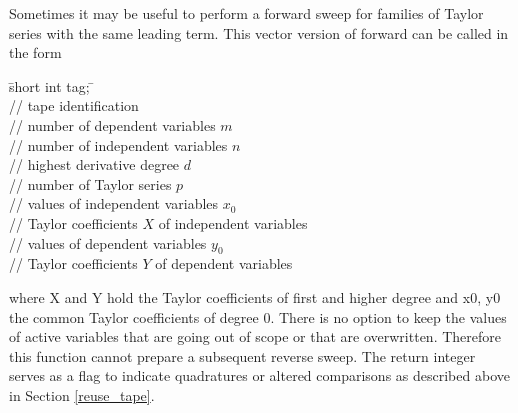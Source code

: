 \documentclass[11pt,twoside]{article}
\begin{document}
Sometimes it may be useful to perform a forward sweep for families of
Taylor series with the same leading term.
This vector version of {\sf forward} can be called in the form
%
\begin{tabbing}
\hspace{0.5in}\={\sf short int tag;} \hspace{1.1in}\= \kill    %
\\
         \> // tape identification \\
                 \> // number of dependent variables $m$\\
                 \> // number of independent variables $n$\\
                 \> // highest derivative degree $d$\\
                 \> // number of Taylor series $p$\\
          \> // values of independent variables $x_0$\\
     \> // Taylor coefficients $X$ of independent variables\\
           \> // values of dependent variables $y_0$\\
     \> // Taylor coefficients $Y$ of dependent variables
\end{tabbing}
%
where {\sf X} and {\sf Y} hold the Taylor coefficients of first
and higher degree and {\sf x0}, {\sf y0} the common Taylor coefficients of 
degree 0. There is no option to keep the values of active variables
that are going out of scope or that are overwritten. Therefore this
function cannot prepare a subsequent reverse sweep.
The return integer serves as a flag to indicate quadratures or altered
comparisons as described above in Section \ref{reuse_tape}.
\end{document}
